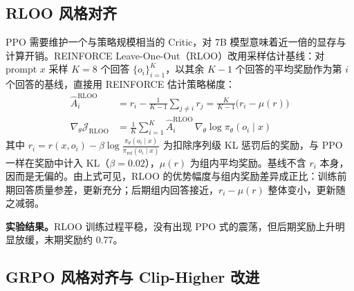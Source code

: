 \documentclass[fontset=fandol,type=master,campus=shenzhen,etitleauto=true]{hithesisbook}
\begin{document}
\subsection{RLOO 风格对齐}\label{rloo-style-align}

PPO 需要维护一个与策略规模相当的 Critic，对 7B 模型意味着近一倍的显存与计算开销。REINFORCE Leave-One-Out（RLOO）\cite{ref88}改用采样估计基线：对 prompt $x$ 采样 $K = 8$ 个回答 $\{o_i\}_{i=1}^{K}$，以其余 $K - 1$ 个回答的平均奖励作为第 $i$ 个回答的基线，直接用 REINFORCE 估计策略梯度：
\begin{equation}\label{eq:rloo}
\begin{aligned}
\hat{A}_i^{\text{RLOO}} &= r_i - \frac{1}{K - 1} \sum_{j \ne i} r_j = \frac{K}{K - 1}\bigl(r_i - \mu(r)\bigr) \\
\nabla_\theta \mathcal{J}_{\text{RLOO}} &= \frac{1}{K} \sum_{i=1}^{K} \hat{A}_i^{\text{RLOO}}\, \nabla_\theta \log \pi_\theta(o_i \mid x)
\end{aligned}
\end{equation}
其中 $r_i = r(x, o_i) - \beta \log \frac{\pi_\theta(o_i \mid x)}{\pi_{\text{ref}}(o_i \mid x)}$ 为扣除序列级 KL 惩罚后的奖励，与 PPO 一样在奖励中计入 KL（$\beta = 0.02$），$\mu(r)$ 为组内平均奖励。基线不含 $r_i$ 本身，因而是无偏的。由上式可见，RLOO 的优势幅度与组内奖励差异成正比：训练前期回答质量参差，更新充分；后期组内回答接近，$r_i - \mu(r)$ 整体变小，更新随之减弱。

\textbf{实验结果。}RLOO 训练过程平稳，没有出现 PPO 式的震荡，但后期奖励上升明显放缓，末期奖励约 0.77。

\subsection{GRPO 风格对齐与 Clip-Higher 改进}\label{grpo-ux98ceux683cux5bf9ux9f50ux4e0e-clip-higher-ux6539ux8fdb}
\end{document}
